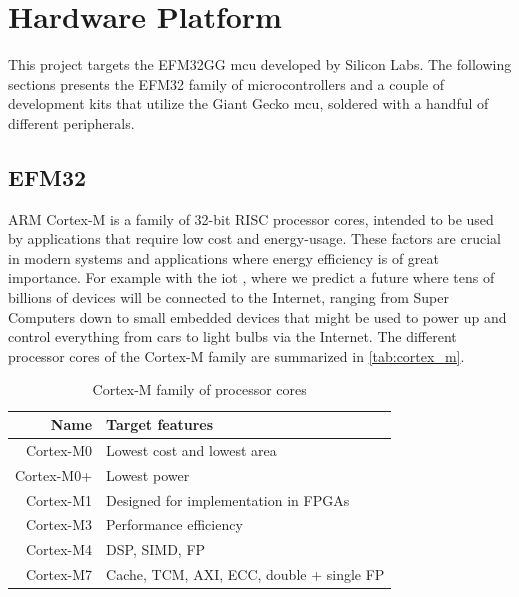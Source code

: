 \section{Hardware Platform}
\label{sec:back:hw}

This project targets the EFM32GG \gls{mcu} developed by Silicon Labs.
The following sections presents the EFM32 family of microcontrollers and a couple of development kits that utilize the Giant Gecko \gls{mcu}, soldered with a handful of different peripherals.

\subsection{EFM32}
\label{sub:emf32}

ARM Cortex-M is a family of 32-bit RISC processor cores, intended to be used by applications that require low cost and energy-usage.
These factors are crucial in modern systems and applications where energy efficiency is of great importance.
For example with the \gls{iot} \cite{Valhouli2010}, where we predict a future where tens of billions of devices will be connected to the Internet, ranging from Super Computers down to small embedded devices that might be used to power up and control everything from cars to light bulbs via the Internet.
The different processor cores of the Cortex-M family are summarized in \autoref{tab:cortex_m}.

\begin{table}[h]
\begin{center}
\begin{tabular}{r|l}
    \textbf{Name} & \textbf{Target features}            \\
    \hline
    Cortex-M0 & Lowest cost and lowest area              \\
    Cortex-M0+ & Lowest power                            \\
    Cortex-M1 & Designed for implementation in FPGAs     \\
    Cortex-M3 & Performance efficiency                   \\
    Cortex-M4 & DSP, SIMD, FP                            \\
    Cortex-M7 & Cache, TCM, AXI, ECC, double + single FP \\
    \hline
    \end{tabular}
\end{center}
\caption{Cortex-M family of processor cores}
\label{tab:cortex_m}
\end{table}

